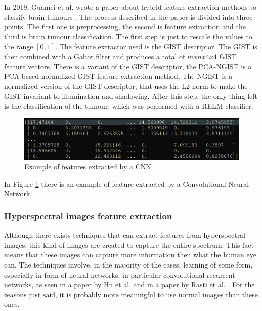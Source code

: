 \documentclass[conference]{IEEEtran}
\begin{document}
					\noindent In 2019, Guamei et al. wrote a paper about hybrid feature extraction methods to classify brain tumours \cite{gumaei2019hybrid}. The process described in the paper is divided into three points. The 
					first one is preprocessing, the second is feature extraction and the third is brain tumour classification. The first step is just to rescale the values to the range $[0,1]$. The feature extractor 
					used is the GIST descriptor. The GIST is then combined with a Gabor filter and produces a total of $mxnx4x4$ GIST feature vectors. There is a variant of the GIST descriptor, the 
					PCA-NGIST is a PCA-based normalized GIST feature extraction method. The NGIST is a normalized version of the GIST descriptor, that uses the L2 norm to make the GIST invariant to illumination and shadowing. 
					After this step, the only thing left is the classification of the tumour, which was performed with a RELM classifier. 
					
					\begin{figure}[!ht]
						\centerline{\includegraphics[width=\linewidth]{imgs/cnn_features.png}}
						\caption{Example of features extracted by a CNN}
						\label{fig:4}
					\end{figure}	
					
					\noindent In Figure \ref{fig:4} there is an example of feature extracted by a Convolutional Neural Network. 
					
				\subsubsection{Hyperspectral images feature extraction}
					
					Although there exists techniques that can extract features from hyperspectral images, this kind of images are created to capture the entire spectrum. This fact means that these images can capture 
					more information then what the human eye can. The techniques involve, in the majority of the cases, learning of some form, especially in form of neural networks, in particular convolutional recurrent 
					networks, as seen in a paper by Hu et al. \cite{hu2020spatial} and in a paper by Rasti et al. \cite{rasti2020feature}. For the reasons just said, it is probably more meaningful to use normal 
					images than these ones.
			
\end{document}
